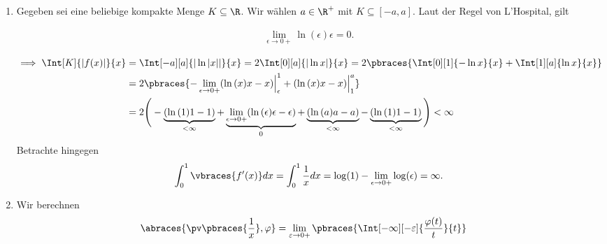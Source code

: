 
\begin{solution}

\phantom{}

\begin{enumerate}[label = (\roman*)]

    \item Gegeben sei eine beliebige kompakte Menge $K \subseteq \R$.
    Wir wählen $a \in \R^+$ mit $K \subseteq [-a, a]$.
    Laut der Regel von L'Hospital, gilt

    \begin{align*}
        \lim_{\epsilon \to 0+}
        \ln{(\epsilon)} \epsilon = 0.
    \end{align*}

    \begin{align*}
        \implies
        \Int[K]{|f(x)|}{x}
        & =
        \Int[-a][a]{|\ln{|x||}}{x}
        =
        2 \Int[0][a]{|\ln{x}|}{x}
        =
        2 \pbraces
        {
            \Int[0][1]{-\ln{x}}{x}
            +
            \Int[1][a]{\ln{x}}{x}
        } \\
        & =
        2 \pbraces
        {
            -
            \lim_{\epsilon \to 0+}
            (\ln{(x)} x - x) \Big|_\epsilon^1
            +
            (\ln{(x)} x - x) \Big|_1^a
        } \\
        & =
        2
        \Bigg (
            -
            \underbrace
            {
                (\ln{(1)} 1 - 1)
            }_{< \infty}
            +
            \underbrace
            {
                \lim_{\epsilon \to 0+}
                (\ln{(\epsilon)} \epsilon - \epsilon)
            }_0
            +
            \underbrace
            {
                (\ln{(a)} a - a)
            }_{< \infty}
            -
            \underbrace
            {
                (\ln{(1)} 1 - 1)
            }_{< \infty}
        \Bigg ) < \infty
	\end{align*}
	Betrachte hingegen 
	\begin{align*}
	\int_0^1 \vbraces{f^\prime(x)} dx = \int_0^1 \frac{1}{x} dx = \log(1) - \lim_{\epsilon \to 0+} \log(\epsilon) = \infty.
	\end{align*}
	\item Wir berechnen
	\begin{align*}
	\abraces{\pv\pbraces{\frac{1}{x}}, \varphi} &= \lim_{\varepsilon \to 0+}
	\pbraces
	{
		\Int[-\infty][-\varepsilon]
		{
			\frac{\varphi(t)}{t}
		}{t}
}
\end{align*}
\end{enumerate}
\end{solution}
